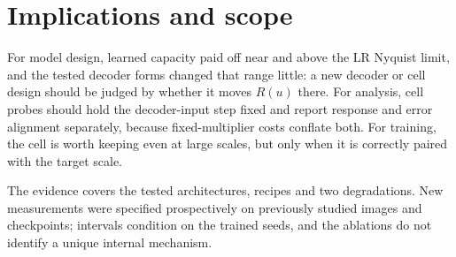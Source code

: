 \documentclass{article}
\begin{document}
\section{Implications and scope}
For model design, learned capacity paid off near and above the LR Nyquist limit, and the tested decoder forms changed that range little: a new decoder or cell design should be judged by whether it moves $R(u)$ there. For analysis, cell probes should hold the decoder-input step fixed and report response and error alignment separately, because fixed-multiplier costs conflate both. For training, the cell is worth keeping even at large scales, but only when it is correctly paired with the target scale.

The evidence covers the tested architectures, recipes and two degradations. New measurements were specified prospectively on previously studied images and checkpoints; intervals condition on the trained seeds, and the ablations do not identify a unique internal mechanism.

\clearpage
\raggedbottom


\end{document}
